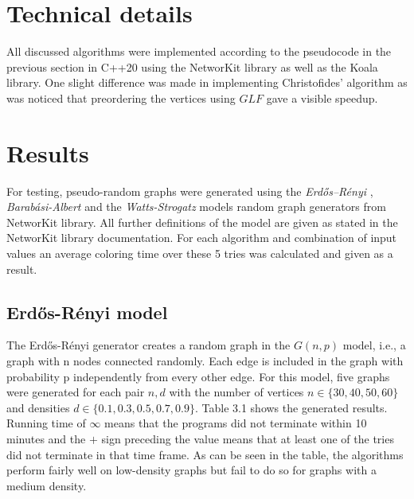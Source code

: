 \section{Technical details}
All discussed algorithms were implemented according to the pseudocode in the previous section in C++20 using the NetworKit \cite{NKT+23} library as well as the Koala \cite{Tur+23} library. One slight difference was made in implementing Christofides' algorithm as was noticed that preordering the vertices using $GLF$ gave a visible speedup.

\section{Results}
\sloppy
For testing, pseudo-random graphs were generated using the \textit{Erdős–\allowbreak Rényi} \cite{erdds1959random}, \textit{Barabási-\allowbreak Albert} \cite{barabasi1999emergence} and the \textit{Watts\allowbreak -Strogatz} \cite{watts1998collective} models random graph generators from NetworKit library. All further definitions of the model are given as stated in the NetworKit library documentation. For each algorithm and combination of input values an average coloring time over these 5 tries was calculated and given as a result.

\subsection{Erdős-Rényi model}
The Erdős-Rényi generator creates a random graph in the $G(n, p)$ model, i.e., a graph with n nodes connected randomly. Each edge is included in the graph with probability p independently from every other edge.
For this model, five graphs were generated for each pair $n, d$ with the number of vertices $n \in \{30, 40, 50, 60\}$ and densities $d \in \{0.1, 0.3, 0.5, 0.7, 0.9\}$. Table 3.1 shows the generated results. Running time of $\infty$ means that the programs did not terminate within 10 minutes and the $+$ sign preceding the value means that at least one of the tries did not terminate in that time frame. As can be seen in the table, the algorithms perform fairly well on low-density graphs but fail to do so for graphs with a medium density.

